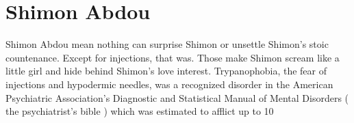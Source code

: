 \documentclass[12pt]{book}
\begin{document}
\chapter{Shimon Abdou}
Shimon Abdou mean nothing can surprise Shimon or unsettle Shimon's stoic countenance. Except for injections, that was. Those make Shimon scream like a little girl and hide behind Shimon's love interest. Trypanophobia, the fear of injections and hypodermic needles, was a recognized disorder in the American Psychiatric Association's Diagnostic and Statistical Manual of Mental Disorders ( the psychiatrist's bible ) which was estimated to afflict up to 10%
\end{document}
